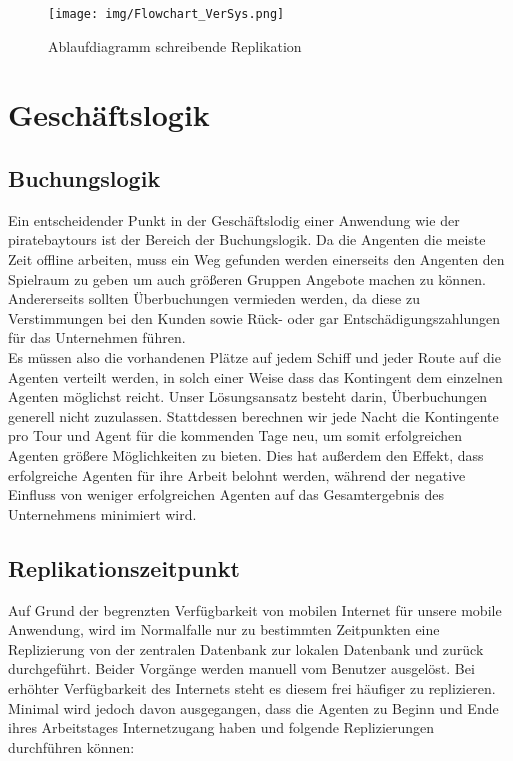 \documentclass[12pt,a4paper,ngerman,english]{report}
\begin{document}
\begin{figure}[h]
  \centering
  \texttt{[image: img/Flowchart\_VerSys.png]}
  \caption{Ablaufdiagramm schreibende Replikation}
  \label{fig:ReplSchreibend}
\end{figure}

\chapter{Geschäftslogik}
\section{Buchungslogik}
\label{sec:Buchungslogik}

Ein entscheidender Punkt in der Geschäftslodig einer Anwendung wie der piratebaytours ist der Bereich der Buchungslogik. Da die Angenten die meiste Zeit offline arbeiten, muss ein Weg gefunden werden einerseits den Angenten den Spielraum zu geben um auch größeren Gruppen Angebote machen zu können. Andererseits sollten Überbuchungen vermieden werden, da diese zu Verstimmungen bei den Kunden sowie Rück- oder gar Entschädigungszahlungen für das Unternehmen führen.\\

Es müssen also die vorhandenen Plätze auf jedem Schiff und jeder Route auf die Agenten verteilt werden, in solch einer Weise dass das Kontingent dem einzelnen Agenten möglichst reicht. Unser Lösungsansatz besteht darin, Überbuchungen generell nicht zuzulassen. Stattdessen berechnen wir jede Nacht die Kontingente pro Tour und Agent für die kommenden Tage neu, um somit erfolgreichen Agenten größere Möglichkeiten zu bieten. Dies hat außerdem den Effekt, dass erfolgreiche Agenten für ihre Arbeit belohnt werden, während der negative Einfluss von weniger erfolgreichen Agenten auf das Gesamtergebnis des Unternehmens minimiert wird.

\section{Replikationszeitpunkt}
\label{sec:RepliZeit}

Auf Grund der begrenzten Verfügbarkeit von mobilen Internet für unsere mobile Anwendung, wird im Normalfalle nur zu bestimmten Zeitpunkten eine Replizierung von der zentralen Datenbank zur lokalen Datenbank und zurück durchgeführt. Beider Vorgänge werden manuell vom Benutzer ausgelöst. Bei erhöhter Verfügbarkeit des Internets steht es diesem frei häufiger zu replizieren. Minimal wird jedoch davon ausgegangen, dass die Agenten zu Beginn und Ende ihres Arbeitstages Internetzugang haben und folgende Replizierungen durchführen können:
\end{document}
